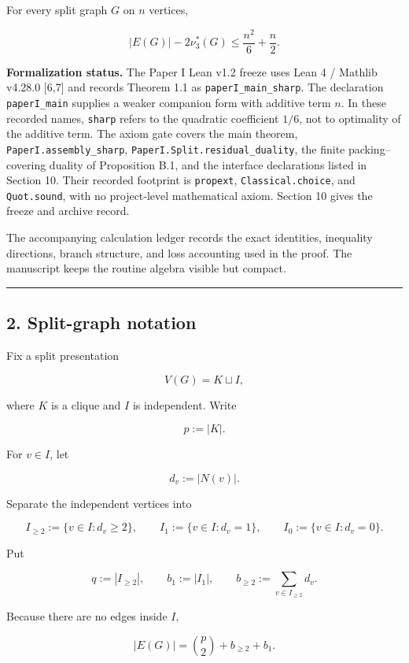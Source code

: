 \documentclass[
  american,
  11pt,
  a4paper,
]{article}
\begin{document}
For every split graph \(G\) on \(n\) vertices,

\[
|E(G)|-2\nu_3^*(G)
\le
\frac{n^2}{6}+\frac{n}{2}.
\]

\textbf{Formalization status.} The Paper I Lean v1.2 freeze uses Lean 4 / Mathlib v4.28.0 {[}6,7{]} and records Theorem 1.1 as \texttt{paperI\_main\_sharp}. The declaration \texttt{paperI\_main} supplies a weaker companion form with additive term \(n\). In these recorded names, \texttt{sharp} refers to the quadratic coefficient \(1/6\), not to optimality of the additive term. The axiom gate covers the main theorem, \texttt{PaperI.assembly\_sharp}, \texttt{PaperI.Split.residual\_duality}, the finite packing--covering duality of Proposition B.1, and the interface declarations listed in Section 10. Their recorded footprint is \texttt{propext}, \texttt{Classical.choice}, and \texttt{Quot.sound}, with no project-level mathematical axiom. Section 10 gives the freeze and archive record.

The accompanying calculation ledger records the exact identities, inequality directions, branch structure, and loss accounting used in the proof. The manuscript keeps the routine algebra visible but compact.

\begin{center}\rule{0.5\linewidth}{0.5pt}\end{center}

\subsection{2. Split-graph notation}\label{split-graph-notation}

Fix a split presentation

\[
V(G)=K\sqcup I,
\]

where \(K\) is a clique and \(I\) is independent. Write

\[
p:=|K|.
\]

For \(v\in I\), let

\[
d_v:=|N(v)|.
\]

Separate the independent vertices into

\[
I_{\ge2}:=\{v\in I:d_v\ge2\},
\qquad
I_1:=\{v\in I:d_v=1\},
\qquad
I_0:=\{v\in I:d_v=0\}.
\]

Put

\[
q:=|I_{\ge2}|,
\qquad
b_1:=|I_1|,
\qquad
b_{\ge2}:=\sum_{v\in I_{\ge2}}d_v.
\]

Because there are no edges inside \(I\),

\[
|E(G)|
=
\binom{p}{2}+b_{\ge2}+b_1.
\tag{2.1}
\]
\end{document}
